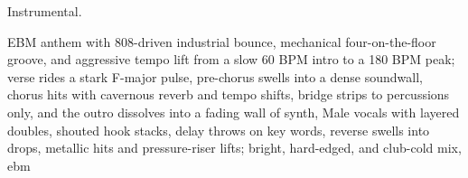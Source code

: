 
\begin{notes}
Instrumental.
\end{notes}
\begin{prompt}
EBM anthem with 808-driven industrial bounce, mechanical four-on-the-floor groove, and aggressive tempo lift from a slow 60 BPM intro to a 180 BPM peak; verse rides a stark F-major pulse, pre-chorus swells into a dense soundwall, chorus hits with cavernous reverb and tempo shifts, bridge strips to percussions only, and the outro dissolves into a fading wall of synth, Male vocals with layered doubles, shouted hook stacks, delay throws on key words, reverse swells into drops, metallic hits and pressure-riser lifts; bright, hard-edged, and club-cold mix, ebm
\end{prompt}

